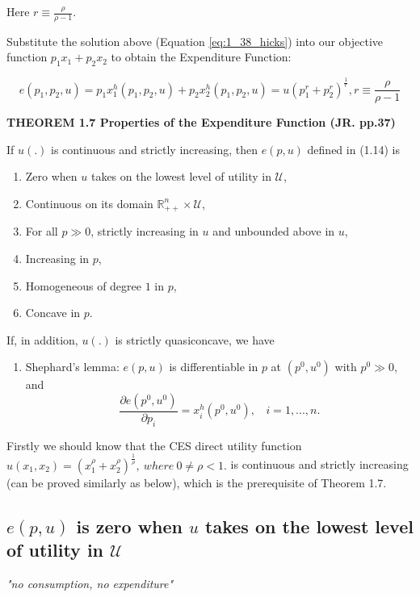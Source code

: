 \documentclass{article}
\newcommand{\R}{\mathbb{R}}
\begin{document}
\begin{mdframed}[backgroundcolor=blue!20,linecolor=white]
Here $r \equiv \frac{\rho}{\rho - 1}$.

Substitute the solution above (Equation \ref{eq:1_38_hicks}) into our
objective function  $p_1x_1 + p_2x_2$ to obtain the Expenditure Function:

$$e(p_1,p_2, u) = p_1x_1^h(p_1,p_2,u) + p_2x_2^h(p_1,p_2,u) = 
u(p_1^{r} + p_2^{r})^{\frac{1}{r}} , r \equiv \frac{\rho}{\rho - 1}$$

\textbf{THEOREM 1.7 Properties of the Expenditure Function (JR. pp.37)}

\medskip

If $u(.)$ is continuous and strictly increasing, then $e(p, u)$ defined in (1.14) is

\begin{enumerate}
\item Zero when $u$ takes on the lowest level of utility in $\mathcal{U}$,
\item Continuous on its domain $\R^n_{++} \times \mathcal{U}$,
\item For all $p \gg 0$, strictly increasing in $u$ and unbounded above in $u$,
\item Increasing in $p$,
\item Homogeneous of degree $1$ in $p$,
\item Concave in $p$.
\end{enumerate}
If, in addition, $u(.)$ is strictly quasiconcave, we have
\begin{enumerate}[start = 7]
\item Shephard’s lemma: $e(p, u)$ is differentiable in $p$ at $(p^0, u^0)$ with $p^0 \gg 0$, and
$$\frac{\partial e(p^0, u^0)}{\partial p_i} = x^h_i (p^0, u^0), \ \ \ \ i = 1, . . . , n.$$
\end{enumerate}
\end{mdframed}

Firstly we should know that the CES direct utility function $u(x_1, x_2) = (x_1^{\rho} + x_2^{\rho})^{\frac{1}{\rho}},\ where \ 0 \ne \rho<1.$ is continuous and strictly increasing (can be proved similarly as below), which is the
prerequisite of Theorem 1.7.

\subsection{$e(p, u)$ is zero when $u$ takes on the lowest level of utility in $\mathcal{U}$}
\begin{mdframed}[backgroundcolor=blue!20,linecolor=white]
\textit{"no consumption, no expenditure"}

\end{mdframed}
\end{document}
